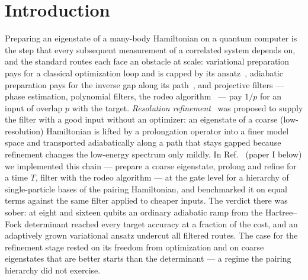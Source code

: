 \documentclass[a4paper,11pt,noarxiv]{quantumarticle}
\begin{document}
\section{Introduction}
\label{sec:intro}
Preparing an eigenstate of a many-body Hamiltonian on a quantum computer is
the step that every subsequent measurement of a correlated system depends
on, and the standard routes each face an obstacle at scale: variational
preparation pays for a classical optimization loop and is capped by its
ansatz~\cite{Peruzzo2014,McClean2018}, adiabatic preparation pays for the
inverse gap along its path~\cite{Albash2018}, and projective filters ---
phase estimation, polynomial filters, the rodeo
algorithm~\cite{Choi2021,Qian2024} --- pay $1/p$ for an input of overlap $p$
with the target.  \emph{Resolution refinement}~\cite{Bogner2026} was
proposed to supply the filter with a good input without an optimizer: an
eigenstate of a coarse (low-resolution) Hamiltonian is lifted by a
prolongation operator into a finer model space and transported
adiabatically along a path that stays gapped because refinement changes the
low-energy spectrum only mildly.  In Ref.~\cite{EigenQPairing2026} (paper I
below) we implemented this chain --- prepare a coarse eigenstate, prolong
and refine for a time $T$, filter with the rodeo algorithm --- at the gate
level for a hierarchy of single-particle bases of the pairing Hamiltonian,
and benchmarked it on equal terms against the same filter applied to
cheaper inputs.  The verdict there was sober: at eight and sixteen qubits an
ordinary adiabatic ramp from the Hartree--Fock determinant reached every
target accuracy at a fraction of the cost, and an adaptively grown
variational ansatz undercut all filtered routes.  The case for the
refinement stage rested on its freedom from optimization and on coarse
eigenstates that are better starts than the determinant --- a regime the
pairing hierarchy did not exercise.
\end{document}
